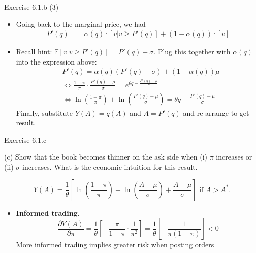 \documentclass[english,10pt,aspectratio=169]{beamer}
\begin{document}
\begin{frame}{Exercise 6.1.b (3)}
	\begin{itemize}
		\item Going back to the marginal price, we had
		\begin{align*}
			P'(q) &= \alpha(q) \mathbb{E}[v|v \ge P'(q)]+(1-\alpha(q))\mathbb{E}[v]
		\end{align*}
		\item Recall hint: $\mathbb{E}[v|v \ge P'(q)]=P'(q)+\sigma$. Plug this together with $\alpha(q)$ into the expression above:
		\begin{align*}
			&P'(q) = \alpha(q) (P'(q)+\sigma) + (1-\alpha(q)) \mu 
			\\
			& \Leftrightarrow \frac{1-\pi}{\pi} \cdot \frac{P'(q)-\mu}{\sigma} = e^{\theta q - \frac{P'(q)-\mu}{\sigma}}  \\
			& \Leftrightarrow \ln \left( \frac{1-\pi}{\pi} \right) + \ln \left( \frac{P'(q)-\mu}{\sigma} \right) = \theta q - \frac{P'(q)-\mu}{\sigma} 
		\end{align*}
		Finally, substitute $Y(A)=q(A)$ and $A=P'(q)$ and re-arrange to get result.
	\end{itemize}
\end{frame}


\begin{frame}{Exercise 6.1.c}
	\begin{exampleblock}{}
		(c) Show that the book becomes thinner on the ask side when (i) $\pi$ increases or (ii) $\sigma$ increases. What is the economic intuition for this result.
	\end{exampleblock}

	\pause

	$$
		Y(A)=\frac{1}{\theta} \left[\ln \left(\frac{1-\pi}{\pi}\right) + \ln \left(\frac{A-\mu}{\sigma}\right) + \frac{A-\mu}{\sigma}\right]\text{ if } A>A^*.
	$$
	\begin{itemize}
		\item \textbf{Informed trading}. 
		\[
		\frac{\partial Y(A)}{\partial \pi} = \frac{1}{\theta}\left[ -\frac{\pi}{1-\pi}\cdot \frac{1}{\pi^2}\right]=\frac{1}{\theta}\left[ -\frac{1}{\pi(1-\pi)}\right]<0
		\]
		More informed trading implies greater risk when posting orders
	\end{itemize}
\end{frame}
\end{document}
